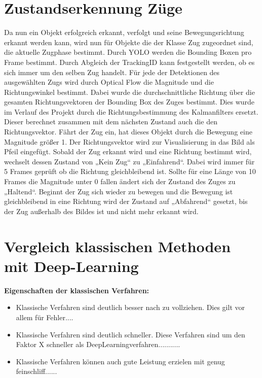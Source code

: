 \documentclass[conference]{IEEEtran}
\begin{document}
	\section{Zustandserkennung Züge}
	Da nun ein Objekt erfolgreich erkannt, verfolgt und seine Bewegungsrichtung erkannt werden kann, wird nun für Objekte die der Klasse Zug zugeordnet sind, die aktuelle Zugphase bestimmt.  
	Durch YOLO werden die Bounding Boxen pro Frame bestimmt. Durch Abgleich der TrackingID kann festgestellt werden, ob es sich immer um den selben Zug handelt. Für jede der Detektionen des ausgewählten Zugs wird durch Optical Flow die Magnitude und die Richtungswinkel bestimmt. Dabei wurde die durchschnittliche Richtung über die gesamten Richtungsvektoren der Bounding Box des Zuges bestimmt. Dies wurde im Verlauf des Projekt durch die Richtungsbestimmung des Kalmanfilters ersetzt. Dieser berechnet zusammen mit dem nächsten Zustand auch die den Richtungsvektor. Fährt der Zug ein, hat dieses Objekt durch die Bewegung eine Magnitude größer 1. Der Richtungsvektor wird zur Visualisierung in das Bild als Pfeil eingefügt. Sobald der Zug erkannt wird und eine Richtung bestimmt wird, wechselt dessen Zustand von „Kein Zug“ zu „Einfahrend“. Dabei wird immer für 5 Frames geprüft ob die Richtung gleichbleibend ist. Sollte für eine Länge von 10 Frames die Magnitude unter 0 fallen ändert sich der Zustand des Zuges zu „Haltend“. Beginnt der Zug sich wieder zu bewegen und die Bewegung ist gleichbleibend in eine Richtung wird der Zustand auf „Abfahrend“ gesetzt, bis der Zug außerhalb des Bildes ist und nicht mehr erkannt wird.
	

	
	\section{Vergleich klassischen Methoden mit Deep-Learning}
	\textbf{Eigenschaften der klassischen Verfahren:}
	\begin{itemize}
		\item Klassische Verfahren sind deutlich besser nach zu vollziehen. Dies gilt vor allem für Fehler....
		
		\item Klassische Verfahren sind deutlich schneller. Diese Verfahren sind um den Faktor X schneller als DeepLearningverfahren...........
		
		\item Klassische Verfahren können auch gute Leistung erzielen mit genug feinschliff......
	\end{itemize}
\end{document}
